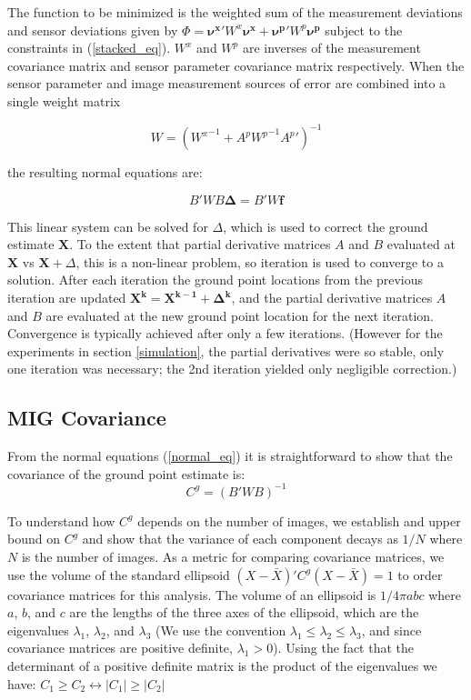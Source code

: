 \documentclass[10pt]{amsart}
\newcommand{\grnd}{\pmb{X}}
\begin{document}
The function to be minimized is the weighted sum of the measurement deviations
and sensor deviations given by 
$\Phi = \pmb{\nu^x}' W^x \pmb{\nu^x} + \pmb{\nu^p}' W^p \pmb{\nu^p}$ 
subject to the constraints in (\ref{stacked_eq}).
$W^x$ and $W^p$ are inverses of the measurement covariance matrix and sensor
parameter covariance matrix respectively. When the sensor parameter and image
measurement sources of error are combined into a single weight matrix

\begin{equation}\label{weight_eq}
W = ({W^x}^{-1} + A^p {W^p}^{-1} {A^p}')^{-1}
\end{equation}

the resulting normal equations are:

\begin{equation} \label{normal_eq}
B' W B\pmb{\Delta} = B' W \pmb{f}
\end{equation}

This linear system can be solved for $\Delta$, which is used to correct the
ground estimate $\grnd$. To the extent that partial derivative matrices $A$
and $B$ evaluated at $\grnd$ vs $\grnd+\Delta$, this is a non-linear
problem, so iteration is used to converge to a solution.  After each iteration
the ground point locations from the previous iteration are updated $\pmb{X^k} =
\pmb{X^{k - 1}} + \pmb{\Delta^k}$, and the partial derivative matrices $A$ and
$B$ are evaluated at the new ground point location for the next iteration.
Convergence is typically achieved after only a few iterations. (However for the
experiments in section \ref{simulation}, the partial derivatives were so stable,
only one iteration was necessary; the 2nd iteration yielded only negligible
correction.)

\subsection{MIG Covariance}
From the normal equations (\ref{normal_eq}) it is straightforward to show that
the covariance of the ground point estimate is:
\begin{equation} \label{covariance_eq}
C^g = (B'WB)^{-1}
\end{equation}

To understand how $C^g$ depends on the number of images, we establish and upper
bound on $C^g$ and show that the variance of each component decays as $1/N$
where $N$ is the number of images.  As a metric for comparing covariance
matrices, we use the volume of the standard ellipsoid $(X - \bar{X})'C^g(X -
\bar{X}) = 1$ to order covariance matrices for this analysis.  The volume of an
ellipsoid is $1/4 \pi abc$ where $a$, $b$, and $c$ are the lengths of the three
axes of the ellipsoid, which are the eigenvalues $\lambda_1$, $\lambda_2$, and
$\lambda_3$ (We use the convention $\lambda_1 \le \lambda_2 \le \lambda_3$, and
since covariance matrices are positive definite, $\lambda_1 > 0$).  Using
the fact that the determinant of a positive definite matrix is the product of
the eigenvalues we have: $C_1 \ge C_2 \leftrightarrow |C_1| \ge |C_2|$
\end{document}
